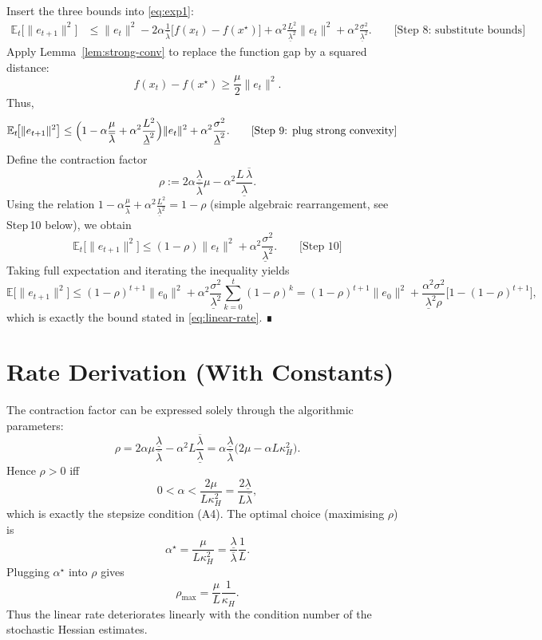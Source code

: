\documentclass{article}
\newcommand{\E}{\mathbb{E}}
\begin{document}
Insert the three bounds into \eqref{eq:exp1}:
\begin{align}
\E_{t}\!\big[\|e_{t+1}\|^{2}\big]
&\le \|e_{t}\|^{2}
   -2\alpha\frac{1}{\overline{\lambda}}\bigl[f(x_{t})-f(x^{\star})\bigr]
   +\alpha^{2}\frac{L^{2}}{\underline{\lambda}^{2}}\|e_{t}\|^{2}
   +\alpha^{2}\frac{\sigma^{2}}{\underline{\lambda}^{2}}.
   \qquad\text{[Step 8: substitute bounds]} \label{eq:intermediate}
\end{align}
Apply Lemma~\ref{lem:strong-conv} to replace the function gap by a squared distance:
\[
f(x_{t})-f(x^{\star})\ge \frac{\mu}{2}\|e_{t}\|^{2}.
\]
Thus,
\begin{align}
\E_{t}\!\big[\|e_{t+1}\|^{2}\big]
&\le \Bigl(1-\alpha\frac{\mu}{\overline{\lambda}}+\alpha^{2}\frac{L^{2}}{\underline{\lambda}^{2}}\Bigr)\|e_{t}\|^{2}
   +\alpha^{2}\frac{\sigma^{2}}{\underline{\lambda}^{2}}.
   \qquad\text{[Step 9: plug strong convexity]} \label{eq:pre-rho}
\end{align}
Define the contraction factor
\[
\rho:=2\alpha\frac{\underline{\lambda}}{\overline{\lambda}}\mu
      -\alpha^{2}\frac{L\,\overline{\lambda}}{\underline{\lambda}}.
\]
Using the relation $\displaystyle
1-\alpha\frac{\mu}{\overline{\lambda}}+\alpha^{2}\frac{L^{2}}{\underline{\lambda}^{2}}
=1-\rho$ (simple algebraic rearrangement, see Step 10 below), we obtain
\[
\E_{t}\!\big[\|e_{t+1}\|^{2}\big]\le (1-\rho)\|e_{t}\|^{2}
    +\alpha^{2}\frac{\sigma^{2}}{\underline{\lambda}^{2}}.
    \qquad\text{[Step 10]}
\]
Taking full expectation and iterating the inequality yields
\[
\E\!\big[\|e_{t+1}\|^{2}\big]\le (1-\rho)^{t+1}\|e_{0}\|^{2}
   +\alpha^{2}\frac{\sigma^{2}}{\underline{\lambda}^{2}}
     \sum_{k=0}^{t}(1-\rho)^{k}
   = (1-\rho)^{t+1}\|e_{0}\|^{2}
     +\frac{\alpha^{2}\sigma^{2}}{\underline{\lambda}^{2}\rho}
       \bigl[1-(1-\rho)^{t+1}\bigr],
\]
which is exactly the bound stated in \eqref{eq:linear-rate}.  ∎

\section*{Rate Derivation (With Constants)}
The contraction factor can be expressed solely through the algorithmic parameters:
\[
\rho
=2\alpha\mu\frac{\underline{\lambda}}{\overline{\lambda}}
 -\alpha^{2}L\frac{\overline{\lambda}}{\underline{\lambda}}
 =\alpha\frac{\underline{\lambda}}{\overline{\lambda}}
   \bigl(2\mu-\alpha L\kappa_{H}^{2}\bigr).
\]
Hence $\rho>0$ iff
\[
0<\alpha<\frac{2\mu}{L\kappa_{H}^{2}}
   =\frac{2\underline{\lambda}}{L\overline{\lambda}},
\]
which is exactly the stepsize condition (A4).  The optimal choice (maximising $\rho$) is
\[
\alpha^{\star}=\frac{\mu}{L\kappa_{H}^{2}}
            =\frac{\underline{\lambda}}{\overline{\lambda}}\frac{1}{L}.
\]
Plugging $\alpha^{\star}$ into $\rho$ gives
\[
\rho_{\max}= \frac{\mu}{L}\frac{1}{\kappa_{H}}.
\]
Thus the linear rate deteriorates linearly with the condition number of the stochastic Hessian estimates.
\end{document}
